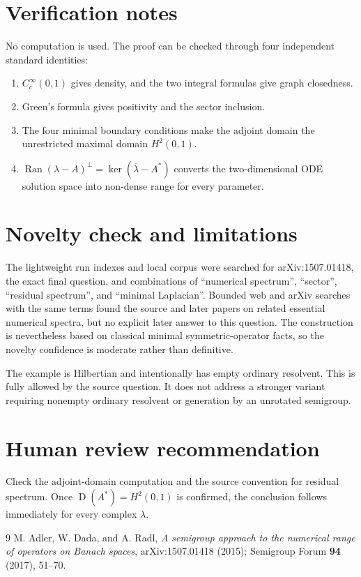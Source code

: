 \documentclass[11pt]{article}
\newcommand{\ran}{\operatorname{Ran}}
\newcommand{\dom}{\operatorname{D}}
\begin{document}
\section*{Verification notes}

No computation is used.  The proof can be checked through four independent standard identities:
\begin{enumerate}
\item $C_c^\infty(0,1)$ gives density, and the two integral formulas give graph closedness.
\item Green's formula gives positivity and the sector inclusion.
\item The four minimal boundary conditions make the adjoint domain the unrestricted maximal domain $H^2(0,1)$.
\item $\ran(\lambda-A)^\perp=\ker(\overline\lambda-A^*)$ converts the two-dimensional ODE solution space into non-dense range for every parameter.
\end{enumerate}

\section*{Novelty check and limitations}

The lightweight run indexes and local corpus were searched for arXiv:1507.01418, the exact final question, and combinations of ``numerical spectrum'', ``sector'', ``residual spectrum'', and ``minimal Laplacian''.  Bounded web and arXiv searches with the same terms found the source and later papers on related essential numerical spectra, but no explicit later answer to this question.  The construction is nevertheless based on classical minimal symmetric-operator facts, so the novelty confidence is moderate rather than definitive.

The example is Hilbertian and intentionally has empty ordinary resolvent.  This is fully allowed by the source question.  It does not address a stronger variant requiring nonempty ordinary resolvent or generation by an unrotated semigroup.

\section*{Human review recommendation}

Check the adjoint-domain computation and the source convention for residual spectrum.  Once $\dom(A^*)=H^2(0,1)$ is confirmed, the conclusion follows immediately for every complex $\lambda$.

\begin{thebibliography}{9}
M. Adler, W. Dada, and A. Radl,
\emph{A semigroup approach to the numerical range of operators on Banach spaces},
arXiv:1507.01418 (2015); Semigroup Forum \textbf{94} (2017), 51--70.
\end{thebibliography}
\end{document}
